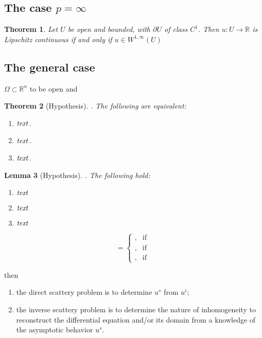 \documentclass[a4paper,11pt]{article}
\newtheorem{theorem}{Theorem}[section]
\newtheorem{lemma}[theorem]{Lemma}
\theoremstyle{definition}
\begin{document}
\subsection{The case $p = \infty$}

\begin{theorem}
    Let $U$ be open and bounded, with $\partial U$ of class $C^1$. 
    Then $u: U \rightarrow \mathbb{R}$ is Lipschitz continuous if and only if $u \in W^{1, \infty}(U)$
\end{theorem}

\newpage 

\subsection{The general case}

$\Omega \subset \mathbb{R}^{n}$ to be open and 

\begin{theorem}
[Hypothesis]. The following are equivalent:
\begin{enumerate}[label=(\roman*)]
\rm \item ${\it text}$. \label{item:1st}
\rm \item ${\it text}$. \label{item:2nd}
\rm \item ${\it text}$. \label{item:3rd}
\end{enumerate}
\end{theorem}

\begin{lemma}
[Hypothesis]. The following hold:
\begin{enumerate}[label=(\alph*)]
\rm \item ${\it text}$ \label{item:first}
\rm \item ${\it text}$ \label{item:second}
\rm \item ${\it text}$ \label{item:third}
\end{enumerate}
\end{lemma}

$$
 =
\begin{cases} 
, & \text{if } \\ 
, & \text{if } \\ 
, & \text{if }  
\end{cases}
$$



then
\begin{enumerate}
\rm\item the direct scattery problem is to determine $u^s$ from $u^i$;
\rm\item the inverse scattery problem is to determine the nature of inhomogeneity to reconstruct the differential equation and/or its domain from a knowledge of the asymptotic behavior $u^s$.
\end{enumerate}
\end{document}
